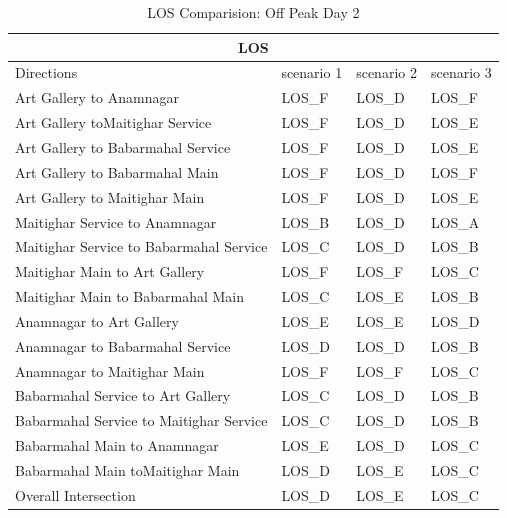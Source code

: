 \begin{table}[h!]
    \centering
    \caption{LOS Comparision: Off Peak Day 2}
    \begin{tabular}{|l|l|l|l|}
         \hline
        \multicolumn{4}{|c|}{\textbf{LOS}} \\
        \hline
        Directions &	scenario 1 &	scenario 2 &	scenario 3 \\
        \hline
        Art Gallery to  Anamnagar	& LOS\_F	& LOS\_D	& LOS\_F \\
        \hline
        Art Gallery toMaitighar Service	& LOS\_F	& LOS\_D	& LOS\_E \\
        \hline
        Art Gallery to Babarmahal Service	& LOS\_F	& LOS\_D	& LOS\_E \\
        \hline
        Art Gallery to Babarmahal Main	& LOS\_F	& LOS\_D	& LOS\_F \\
        \hline
        Art Gallery to  Maitighar Main	& LOS\_F	& LOS\_D	& LOS\_E \\
        \hline
        Maitighar Service to  Anamnagar	& LOS\_B	& LOS\_D	& LOS\_A \\
        \hline
        Maitighar Service to Babarmahal Service	& LOS\_C	& LOS\_D	& LOS\_B \\
        \hline
        Maitighar Main to  Art Gallery	& LOS\_F	& LOS\_F	& LOS\_C \\
        \hline
        Maitighar Main to Babarmahal Main	& LOS\_C	& LOS\_E	& LOS\_B \\
        \hline
        Anamnagar to Art Gallery	& LOS\_E	& LOS\_E	& LOS\_D \\
        \hline
        Anamnagar to  Babarmahal Service	& LOS\_D	& LOS\_D	& LOS\_B \\
        \hline
        Anamnagar to Maitighar Main	& LOS\_F	& LOS\_F	& LOS\_C \\
        \hline
        Babarmahal Service to  Art Gallery	& LOS\_C	& LOS\_D	& LOS\_B \\
        \hline
        Babarmahal Service  to Maitighar Service	& LOS\_C	& LOS\_D	& LOS\_B \\
        \hline
        Babarmahal Main to  Anamnagar	& LOS\_E	& LOS\_D	& LOS\_C \\
        \hline
        Babarmahal Main toMaitighar Main	& LOS\_D	& LOS\_E	& LOS\_C \\
        \hline
        Overall Intersection	& LOS\_D	& LOS\_E	& LOS\_C \\
        \hline

    \end{tabular}

\end{table}

